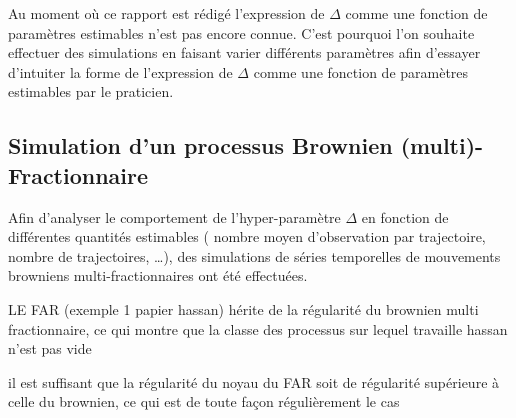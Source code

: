
Au moment où ce rapport est rédigé l'expression de $\Delta$ comme une fonction de paramètres estimables n'est pas encore connue. C'est pourquoi l'on souhaite effectuer des simulations en faisant varier différents paramètres afin d'essayer d'intuiter la forme de l'expression de $\Delta$ comme une fonction de paramètres estimables par le praticien.

\citationrequise

\subsection{Simulation d'un processus Brownien (multi)-Fractionnaire}

Afin d'analyser le comportement de l'hyper-paramètre $\Delta$ en fonction de différentes quantités estimables ( nombre moyen d'observation par trajectoire, nombre de trajectoires, \dots ), des simulations de séries temporelles de mouvements browniens multi-fractionnaires ont été effectuées.







LE FAR (exemple 1 papier hassan) hérite de la régularité du brownien multi fractionnaire, ce qui montre que la classe des processus sur lequel travaille hassan n'est pas vide

il est suffisant que la régularité du noyau du FAR soit de régularité supérieure à celle du brownien, ce qui est de toute façon régulièrement le cas


